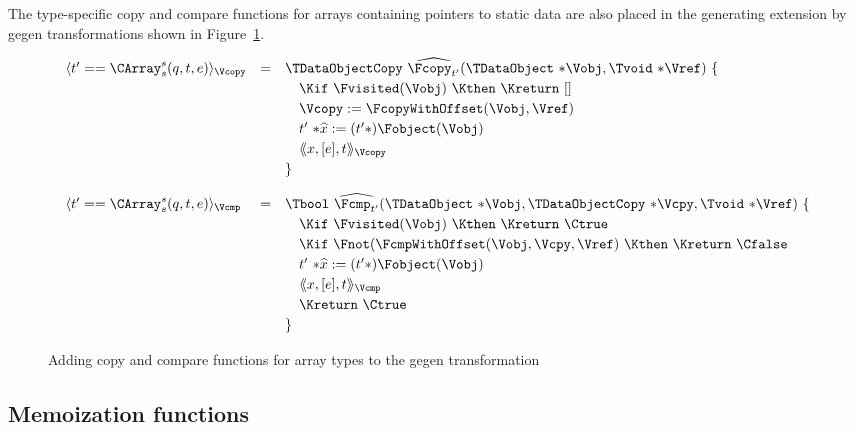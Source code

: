\begin{docpart}
The type-specific copy and compare functions for arrays
containing pointers to static data are also placed in the generating
extension by gegen transformations shown in
Figure~\ref{fig:SLFArrayCopyCmpFun}.
\begin{figure}[htb]
  \begin{center}
    \small
    \[\def\arraystretch{1.2}
    \begin{array}{@{}lcl@{}}
      \gegen{t' == \CArray_s^s(q, t, e)}_{\Vcopy} &
      =& \TDataObjectCopy\ \widehat{\Fcopy_{t'}}
        (\TDataObject\ {*}\Vobj, \Tvoid\ {*}\Vref)\ \{ \\
      && \quad \Kif\ \Fvisited(\Vobj)\ \Kthen\ \Kreturn\ [] \\
      && \quad \Vcopy := \FcopyWithOffset(\Vobj, \Vref) \\
      && \quad t'\ {*}\widehat{x} := (t'*)\Fobject(\Vobj) \\
      && \quad \gegen*{x,[e],t}_{\Vcopy} \\
      && \}
      \\[1em]
      \gegen{t' == \CArray_s^s(q, t, e)}_{\Vcmp} &
      =& \Tbool\ \widehat{\Fcmp_{t'}}
        (\TDataObject\ {*}\Vobj, \TDataObjectCopy\ {*}\Vcpy,
         \Tvoid\ {*}\Vref)\ \{ \\
      && \quad \Kif\ \Fvisited(\Vobj)\ \Kthen\ \Kreturn\ \Ctrue \\
      && \quad \Kif\ \Fnot(\FcmpWithOffset(\Vobj, \Vcpy, \Vref)\
                \Kthen\ \Kreturn\ \Cfalse\\
      && \quad t'\ {*}\widehat{x} := (t'*)\Fobject(\Vobj) \\
      && \quad \gegen*{x,[e],t}_{\Vcmp} \\
      && \quad \Kreturn\ \Ctrue \\
      && \}
    \end{array}
    \]
    \caption{Adding copy and compare functions for array types to the
      gegen transformation}
    \label{fig:SLFArrayCopyCmpFun}
  \end{center}
\end{figure}


\subsection{Memoization functions}
\label{sec:SLFMemoizationFunctions}


\end{docpart}
